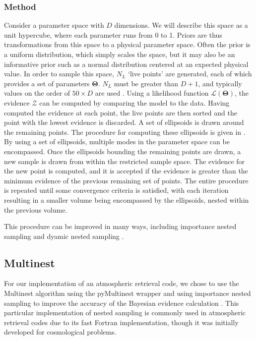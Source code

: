 \subsubsection{Method}
Consider a parameter space with $D$ dimensions.
We will describe this space as a unit hypercube, where each parameter runs from 0 to 1.
Priors are thus transformations from this space to a physical parameter space.
Often the prior is a uniform distribution, which simply scales the space, but it may also be an informative prior such as a normal distribution centered at an expected physical value.
In order to sample this space, $N_{L}$ `live points' are generated, each of which provides a set of parameters $\mathbf{\Theta}$. 
$N_{L}$ must be greater than $D+1$, and typically values on the order of $50\times D$ are used \parencite{Feroz2009}.
Using a likelihood function $\mathcal{L}(\mathbf{\Theta})$, the evidence $\mathcal{Z}$ can be computed by comparing the model to the data.
Having computed the evidence at each point, the live points are then sorted and the point with the lowest evidence is discarded.
A set of ellipsoids is drawn around the remaining points. 
The procedure for computing these ellipsoids is given in \parencite{Feroz2008,Feroz2009}.
By using a set of ellipsoids, multiple modes in the parameter space can be encompassed.
Once the ellipsoids bounding the remaining points are drawn, a new sample is drawn from within the restricted sample space.
The evidence for the new point is computed, and it is accepted if the evidence is greater than the minimum evidence of the previous remaining set of points.
The entire procedure is repeated until some convergence criteria is satisfied, with each iteration resulting in a smaller volume being encompassed by the ellipsoids, nested within the previous volume.

This procedure can be improved in many ways, including importance nested sampling \parencite{Feroz2019} and dyamic nested sampling \parencite{Speagle2020}. 

\subsection{Multinest}
For our implementation of an atmospheric retrieval code, we chose to use the Multinest algorithm \parencite{Feroz2009} using the pyMultinest wrapper \parencite{Buchner2014} and using importance nested sampling to improve the accuracy of the Bayesian evidence calculation \parencite{Feroz2019}.
This particular implementation of nested sampling is commonly used in atmospheric retrieval codes due to its fast Fortran implementation, though it was initially developed for cosmological problems.

